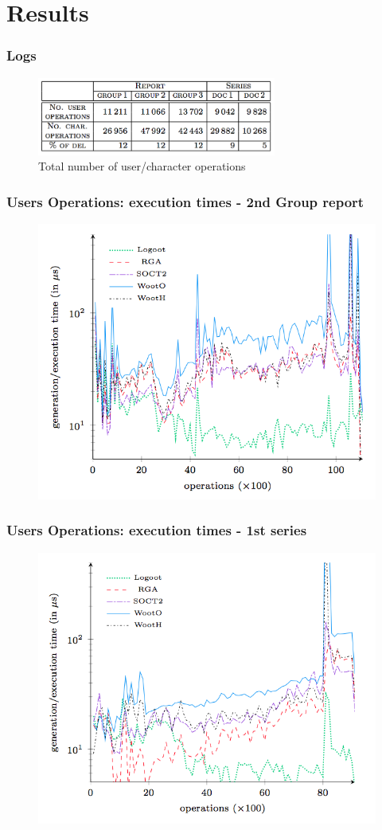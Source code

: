 \documentclass[14pt]{beamer}
\begin{document}
\section{Results}
	\begin{frame}
		\frametitle{Logs}
		\begin{figure}
  			\includegraphics[width=0.7\textwidth]{../includes/operations.png}
  			\caption{Total number of user/character operations}
		\end{figure}
	\end{frame}
	\begin{frame}
		\frametitle{Users Operations: execution times - 2nd Group report}
		\begin{figure}
			\includegraphics[width=.7\textwidth]{../includes/users_operations_2g_report.png}
		\end{figure}
	\end{frame}
	\begin{frame}
		\frametitle{Users Operations: execution times - 1st series}
		\begin{figure}
  \includegraphics[width=.7\textwidth]{../includes/users_operations_1t_big.png}
		\end{figure}
	\end{frame}
\end{document}

